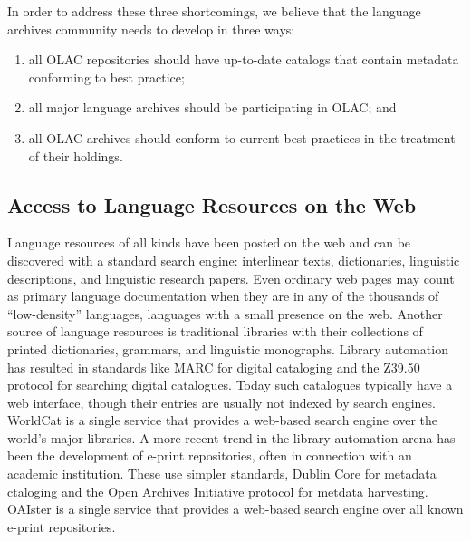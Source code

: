 
In order to address these three shortcomings, we believe that the
language archives community needs to develop in three ways:

\begin{enumerate}\setlength{\itemsep}{0pt}
\item all OLAC repositories should have up-to-date catalogs
      that contain metadata conforming to best practice;
\item all major language archives should be participating in OLAC; and
\item all OLAC archives should conform to current best practices
      in the treatment of their holdings.
\end{enumerate}

\subsection{Access to Language Resources on the Web}


Language resources of all kinds have been posted on the web
and can be discovered with a standard search engine:
interlinear texts, dictionaries, linguistic descriptions, and
linguistic research papers.  Even ordinary web pages may count
as primary language documentation when they are in any of the
thousands of ``low-density'' languages, languages with a small
presence on the web.  Another source of language resources is traditional
libraries with their collections of printed dictionaries, grammars,
and linguistic monographs.  Library automation has resulted in
standards like MARC for digital cataloging and the Z39.50 protocol for 
searching digital catalogues. Today such catalogues typically have a web
interface, though their entries are usually not indexed by search
engines.  WorldCat is a single service that provides a web-based search
engine over the world's major libraries. A more recent trend in the library automation arena has been
the development of e-print repositories, often in connection with an academic institution.  These use simpler standards, Dublin Core for
metadata ctaloging and the Open Archives Initiative protocol for metdata
harvesting.  OAIster is a single service that provides a web-based
search engine over all known e-print repositories.


